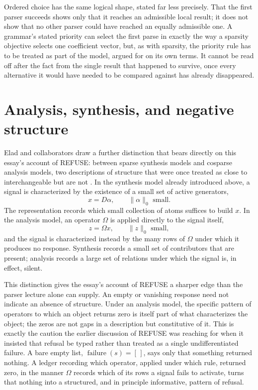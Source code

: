 \documentclass[11pt]{article}
\begin{document}
Ordered choice has the same logical shape, stated far less precisely. That the first parser succeeds shows only that it reaches an admissible local result; it does not show that no other parser could have reached an equally admissible one. A grammar's stated priority can select the first parse in exactly the way a sparsity objective selects one coefficient vector, but, as with sparsity, the priority rule has to be treated as part of the model, argued for on its own terms. It cannot be read off after the fact from the single result that happened to survive, once every alternative it would have needed to be compared against has already disappeared.

\section{Analysis, synthesis, and negative structure}

Elad and collaborators draw a further distinction that bears directly on this essay's account of REFUSE: between sparse synthesis models and cosparse analysis models, two descriptions of structure that were once treated as close to interchangeable but are not \cite{elad-milanfar-rubinstein-2007}. In the synthesis model already introduced above, a signal is characterized by the existence of a small set of active generators,
\[
x = D\alpha, \qquad \|\alpha\|_0 \text{ small}.
\]
The representation records which small collection of atoms suffices to build $x$. In the analysis model, an operator $\Omega$ is applied directly to the signal itself,
\[
z = \Omega x, \qquad \|z\|_0 \text{ small},
\]
and the signal is characterized instead by the many rows of $\Omega$ under which it produces no response. Synthesis records a small set of contributors that are present; analysis records a large set of relations under which the signal is, in effect, silent.

This distinction gives the essay's account of REFUSE a sharper edge than the parser lecture alone can supply. An empty or vanishing response need not indicate an absence of structure. Under an analysis model, the specific pattern of operators to which an object returns zero is itself part of what characterizes the object; the zeros are not gaps in a description but constitutive of it. This is exactly the caution the earlier discussion of REFUSE was reaching for when it insisted that refusal be typed rather than treated as a single undifferentiated failure. A bare empty list, $\operatorname{failure}(s) = [\,]$, says only that something returned nothing. A ledger recording which operator, applied under which rule, returned zero, in the manner $\Omega$ records which of its rows a signal fails to activate, turns that nothing into a structured, and in principle informative, pattern of refusal.
\end{document}
